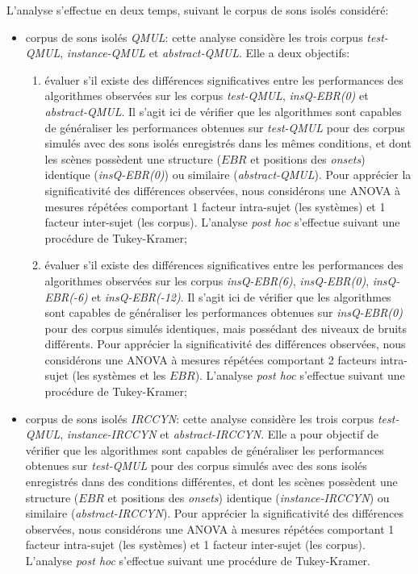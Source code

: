 L'analyse s'effectue en deux temps, suivant le corpus de sons isolés considéré:

\begin{itemize}

\item corpus de sons isolés \emph{QMUL}: cette analyse considère les trois corpus \emph{test-QMUL}, \emph{instance-QMUL} et \emph{abstract-QMUL}. Elle a deux objectifs:

\begin{enumerate}
\item évaluer s'il existe des différences significatives entre les performances des algorithmes observées sur les corpus \emph{test-QMUL}, \emph{insQ-EBR(0)} et \emph{abstract-QMUL}. Il s'agit ici de vérifier que les algorithmes sont capables de généraliser les performances obtenues sur \emph{test-QMUL} pour des corpus simulés avec des sons isolés enregistrés dans les mêmes conditions, et dont les scènes possèdent une structure ($EBR$ et positions des \emph{onsets}) identique (\emph{insQ-EBR(0)}) ou similaire (\emph{abstract-QMUL}). Pour apprécier la significativité des différences observées, nous considérons une ANOVA à mesures répétées comportant 1 facteur intra-sujet (les systèmes) et 1 facteur inter-sujet (les corpus). L'analyse \emph{post hoc} s'effectue suivant une procédure de Tukey-Kramer;

\item évaluer s'il existe des différences significatives entre les performances des algorithmes observées sur les corpus \emph{insQ-EBR(6)}, \emph{insQ-EBR(0)}, \emph{insQ-EBR(-6)} et \emph{insQ-EBR(-12)}. Il s'agit ici de vérifier que les algorithmes sont capables de généraliser les performances obtenues sur \emph{insQ-EBR(0)} pour des corpus simulés identiques, mais possédant des niveaux de bruits différents. Pour apprécier la significativité des différences observées, nous considérons une ANOVA à mesures répétées comportant 2 facteurs intra-sujet (les systèmes et les $EBR$). L'analyse \emph{post hoc} s'effectue suivant une procédure de Tukey-Kramer;

\end{enumerate}

\item corpus de sons isolés \emph{IRCCYN}: cette analyse considère les trois corpus \emph{test-QMUL}, \emph{instance-IRCCYN} et \emph{abstract-IRCCYN}. Elle a pour objectif de vérifier que les algorithmes sont capables de généraliser les performances obtenues sur \emph{test-QMUL} pour des corpus simulés avec des sons isolés enregistrés dans des conditions différentes, et dont les scènes possèdent une structure ($EBR$ et positions des \emph{onsets}) identique (\emph{instance-IRCCYN}) ou similaire (\emph{abstract-IRCCYN}). Pour apprécier la significativité des différences observées, nous considérons une ANOVA à mesures répétées comportant 1 facteur intra-sujet (les systèmes) et 1 facteur inter-sujet (les corpus). L'analyse \emph{post hoc} s'effectue suivant une procédure de Tukey-Kramer.

\end{itemize}

